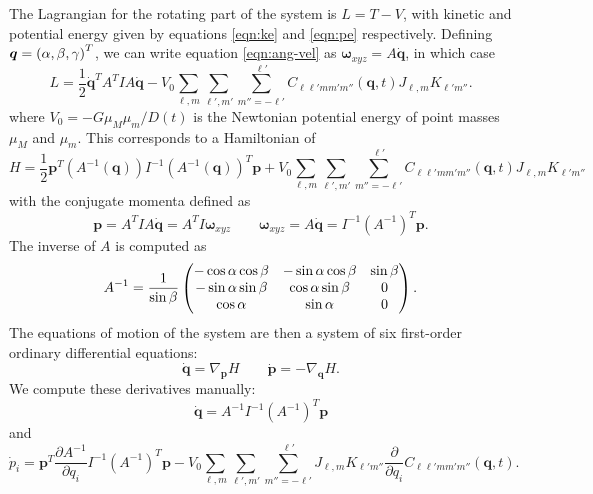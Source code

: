 \documentclass[11pt]{article}
\begin{document}
The Lagrangian for the rotating part of the system is $L=T-V$, with kinetic and potential energy given by equations \ref{eqn:ke} and \ref{eqn:pe} respectively. Defining $\bm q = \left( \alpha, \beta, \gamma \right)^T$, we can write equation \ref{eqn:ang-vel} as $\bm \omega_{xyz} = A\bm {\dot q}$, in which case
\begin{equation}
L = \frac{1}{2}\bm {\dot q}^T A^T I A \bm {\dot q} - V_0\sum_{\ell, m}\sum_{\ell', m'} \sum_{m''=-\ell'}^{\ell'} C_{\ell \ell' m m' m''}(\bm q, t) J_{\ell, m} K_{\ell' m''}.
\end{equation}
where $V_0= -G \mu_M \mu_m / D(t)$ is the Newtonian potential energy of point masses $\mu_M$ and $\mu_m$. This corresponds to a Hamiltonian of
\begin{equation}
H = \frac{1}{2}\bm p^T (A^{-1}(\bm q)) I^{-1} (A^{-1}(\bm q))^T \bm p + V_0\sum_{\ell, m}\sum_{\ell', m'} \sum_{m''=-\ell'}^{\ell'} C_{\ell \ell' m m' m''}(\bm q, t) J_{\ell, m} K_{\ell' m''}
\label{eqn:hamiltonian}
\end{equation}
with the conjugate momenta defined as
\begin{equation}
\bm p = A^T I A \bm {\dot q} = A^T I \bm \omega_{xyz}
\qquad
\bm \omega_{xyz} = A \bm {\dot q} = I^{-1}(A^{-1})^T \bm p.
\label{eqn:momenta}
\end{equation}
The inverse of $A$ is computed as
\begin{equation}
A^{-1} = \frac{1}{\sin{\beta}} \left( \begin{matrix}
-\cos\alpha \cos \beta & -\sin \alpha \cos \beta & \sin \beta \\
-\sin \alpha \sin \beta & \cos \alpha \sin \beta & 0 \\
\cos \alpha & \sin \alpha & 0
\end{matrix} \right).
\label{eqn:a-inv}
\end{equation}
The equations of motion of the system are then a system of six first-order ordinary differential equations:
\begin{equation}
\bm{\dot q} = \nabla_{\bm{p}} H \qquad \bm{\dot p} = -\nabla_{\bm{q}} H.
\label{eqn:first-eom}
\end{equation}
We compute these derivatives manually:
\begin{equation}
\bm{\dot q} = A^{-1}I^{-1}(A^{-1})^T\bm p
\label{eqn:eom-q}
\end{equation}
and
\begin{equation}
\dot p_i = \bm p^T \frac{\partial A^{-1}}{\partial q_i} I^{-1} (A^{-1})^T \bm p -V_0 \sum_{\ell, m}\sum_{\ell', m'} \sum_{m''=-\ell'}^{\ell'} J_{\ell, m} K_{\ell' m''} \frac{\partial}{\partial q_i}C_{\ell \ell' m m' m''}(\bm q, t).
\label{eqn:eom-p}
\end{equation}
\end{document}
